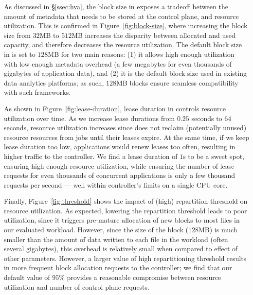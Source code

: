  As discussed in \S\ref{ssec:hva}, the block size in \jiffy exposes a tradeoff between the amount of metadata that needs to be stored at the control plane, and resource utilization. This is confirmed in Figure~\ref{fig:block-size}, where increasing the block size from $32$MB to $512$MB increases the disparity between allocated and used capacity, and therefore decreases the resource utilization. The default block size in \jiffy is set to $128$MB for two main reasons: (1) it allows high enough utilization with low enough metadata overhead (a few megabytes for even thousands of gigabytes of application data), and (2) it is the default block size used in existing data analytics platforms; as such, $128$MB blocks ensure seamless compatibility with such frameworks.

 As shown in Figure~\ref{fig:lease-duration}, lease duration in \jiffy controls resource utilization over time. As we increase lease durations from $0.25$ seconds to $64$ seconds, resource utilization increases since \jiffy does not reclaim (potentially unused) resource resources from jobs until their leases expire. At the same time, if we keep lease duration too low, applications would renew leases too often, resulting in higher traffic to the \jiffy controller. We find a lease duration of $1$s to be a sweet spot, ensuring high enough resource utilization, while ensuring the number of lease requests for even thousands of concurrent applications is only a few thousand requests per second --- well within \jiffy controller's limits on a single CPU core.

 Finally, Figure~\ref{fig:threshold} shows the impact of (high) repartition threshold on resource utilization. As expected, lowering the repartition threshold leads to poor utilization, since it triggers pre-mature allocation of new blocks to most files in our evaluated workload. However, since the size of the block ($128$MB) is much smaller than the amount of data written to each file in the workload (often several gigabytes), this overhead is relatively small when compared to effect of other parameters. However, a larger value of high repartitioning threshold results in more frequent block allocation requests to the controller; we find that our default value of $95\%$ provides a reasonable compromise between resource utilization and number of control plane requests.

